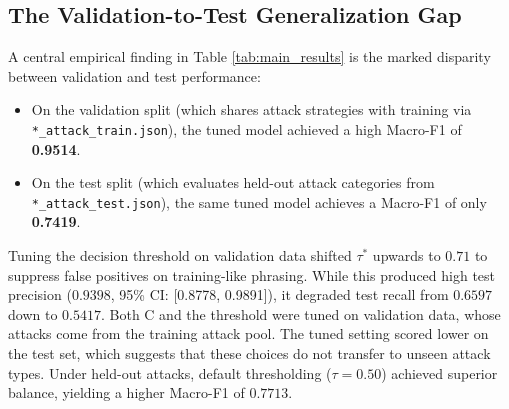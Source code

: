 \documentclass[10pt,conference]{IEEEtran}
\begin{document}
\begin{table}[t]
\centering
\small
\caption{Test Set Results on Leakage-Free BIPIA (V2 Dataset, 288 Test Samples Across 72 Documents)}
\label{tab:main_results}
\end{table}

\subsection{The Validation-to-Test Generalization Gap}
A central empirical finding in Table \ref{tab:main_results} is the marked disparity between validation and test performance:
\begin{itemize}
    \item On the validation split (which shares attack strategies with training via \texttt{*\_attack\_train.json}), the tuned model achieved a high Macro-F1 of \textbf{0.9514}.
    \item On the test split (which evaluates held-out attack categories from \texttt{*\_attack\_test.json}), the same tuned model achieves a Macro-F1 of only \textbf{0.7419}.
\end{itemize}
Tuning the decision threshold on validation data shifted $\tau^*$ upwards to $0.71$ to suppress false positives on training-like phrasing. While this produced high test precision ($0.9398$, 95\% CI: [0.8778, 0.9891]), it degraded test recall from $0.6597$ down to $0.5417$. Both C and the threshold were tuned on validation data, whose attacks come from the training attack pool. The tuned setting scored lower on the test set, which suggests that these choices do not transfer to unseen attack types. Under held-out attacks, default thresholding ($\tau=0.50$) achieved superior balance, yielding a higher Macro-F1 of $0.7713$.
\end{document}
